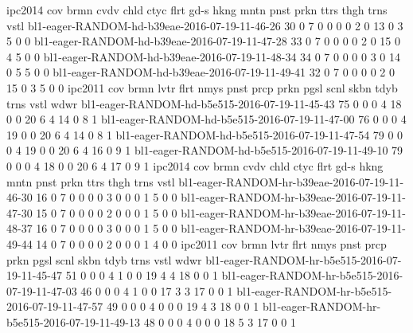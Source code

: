 ipc2014                                         cov  brmn  cvdv  chld  ctyc  flrt  gd-s  hkng  mntn  pnst  prkn  ttrs  thgh  trns  vstl  
bl1-eager-RANDOM-hd-b39eae-2016-07-19-11-46-26  30   0     7     0     0     0     0     2     0     13    0     3     5     0     0  
bl1-eager-RANDOM-hd-b39eae-2016-07-19-11-47-28  33   0     7     0     0     0     0     2     0     15    0     4     5     0     0  
bl1-eager-RANDOM-hd-b39eae-2016-07-19-11-48-34  34   0     7     0     0     0     0     3     0     14    0     5     5     0     0  
bl1-eager-RANDOM-hd-b39eae-2016-07-19-11-49-41  32   0     7     0     0     0     0     2     0     15    0     3     5     0     0
ipc2011                                         cov  brmn  lvtr  flrt  nmys  pnst  prcp  prkn  pgsl  scnl  skbn  tdyb  trns  vstl  wdwr
bl1-eager-RANDOM-hd-b5e515-2016-07-19-11-45-43  75   0     0     0     4     18    0     0     20    6     4     14    0     8     1
bl1-eager-RANDOM-hd-b5e515-2016-07-19-11-47-00  76   0     0     0     4     19    0     0     20    6     4     14    0     8     1
bl1-eager-RANDOM-hd-b5e515-2016-07-19-11-47-54  79   0     0     0     4     19    0     0     20    6     4     16    0     9     1
bl1-eager-RANDOM-hd-b5e515-2016-07-19-11-49-10  79   0     0     0     4     18    0     0     20    6     4     17    0     9     1
ipc2014                                         cov  brmn  cvdv  chld  ctyc  flrt  gd-s  hkng  mntn  pnst  prkn  ttrs  thgh  trns  vstl
bl1-eager-RANDOM-hr-b39eae-2016-07-19-11-46-30  16   0     7     0     0     0     0     3     0     0     0     1     5     0     0
bl1-eager-RANDOM-hr-b39eae-2016-07-19-11-47-30  15   0     7     0     0     0     0     2     0     0     0     1     5     0     0
bl1-eager-RANDOM-hr-b39eae-2016-07-19-11-48-37  16   0     7     0     0     0     0     3     0     0     0     1     5     0     0
bl1-eager-RANDOM-hr-b39eae-2016-07-19-11-49-44  14   0     7     0     0     0     0     2     0     0     0     1     4     0     0
ipc2011                                         cov  brmn  lvtr  flrt  nmys  pnst  prcp  prkn  pgsl  scnl  skbn  tdyb  trns  vstl  wdwr
bl1-eager-RANDOM-hr-b5e515-2016-07-19-11-45-47  51   0     0     0     4     1     0     0     19    4     4     18    0     0     1
bl1-eager-RANDOM-hr-b5e515-2016-07-19-11-47-03  46   0     0     0     4     1     0     0     17    3     3     17    0     0     1
bl1-eager-RANDOM-hr-b5e515-2016-07-19-11-47-57  49   0     0     0     4     0     0     0     19    4     3     18    0     0     1
bl1-eager-RANDOM-hr-b5e515-2016-07-19-11-49-13  48   0     0     0     4     0     0     0     18    5     3     17    0     0     1
